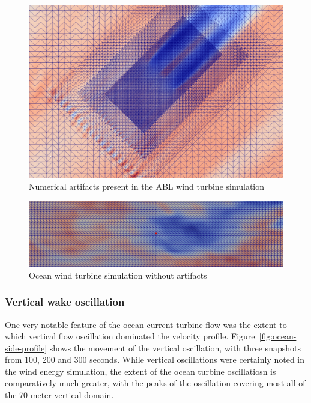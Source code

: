 \begin{figure}
\centering
\includegraphics[width=\textwidth]{images/neutralWindPlantAvgVelPlanMeshRefine}
\caption{Numerical artifacts present in the ABL wind turbine simulation}
\label{fig:neutralWindPlantAvgVelPlanMeshRefine}
\end{figure}

\begin{figure}
\centering
\includegraphics[width=\textwidth]{images/OceanMeshRefinement}
\caption{Ocean wind turbine simulation without artifacts}
\label{fig:OceanMeshRefinement}
\end{figure}



\subsubsection{Vertical wake oscillation}

One very notable feature of the ocean current turbine flow was the extent to which vertical flow oscillation dominated the velocity profile. Figure~\ref{fig:ocean-side-profile} shows the movement of the vertical oscillation, with three snapshots from 100, 200 and 300 seconds. While vertical oscillations were certainly noted in the wind energy simulation, the extent of the ocean turbine oscillatiosn is comparatively much greater, with the peaks of the oscillation covering most all of the 70 meter vertical domain.


